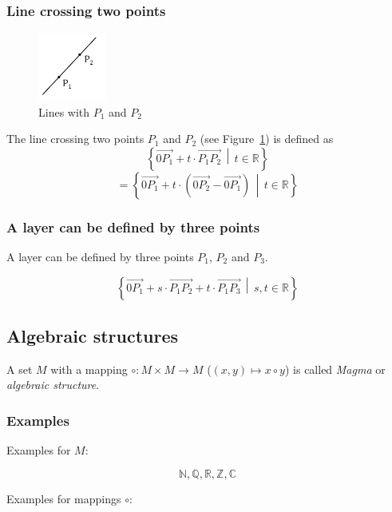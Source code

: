 \documentclass[a4paper,landscape,twocolumn]{article}
\newcommand\setdef[2]{\left\{#1\,\middle|\,#2\right\}}
\begin{document}
\subsubsection{Line crossing two points}
%
\begin{figure}[!h]
  \begin{center}
    \includegraphics[width=0.2\textwidth]{img/line_with_P1_and_P2.pdf}
    \caption{Lines with $P_1$ and $P_2$}
    \label{img:line}
  \end{center}
\end{figure}
%
The line crossing two points $P_1$ and $P_2$ (see Figure~\ref{img:line}) is defined as
\[ \setdef{\overrightarrow{0P_1} + t \cdot \overrightarrow{P_1 P_2}}{t \in \mathbb{R}} \]
\[ = \setdef{\overrightarrow{0P_1} + t \cdot \left(\overrightarrow{0P_2} - \overrightarrow{0P_1}\right)}{t \in \mathbb{R}} \]

\subsubsection{A layer can be defined by three points}

A layer can be defined by three points $P_1$, $P_2$ and $P_3$.

\[ \setdef{\overrightarrow{0P_1} + s \cdot \overrightarrow{P_1 P_2} + t \cdot \overrightarrow{P_1 P_3}}{s, t \in \mathbb{R}} \]

\subsection{Algebraic structures}

A set $M$ with a mapping $\circ: M \times M \rightarrow M$ ($(x, y) \mapsto x \circ y$)
is called \emph{Magma} or \emph{algebraic structure}.

\subsubsection{Examples}

Examples for $M$:

\[ \mathbb{N}, \mathbb{Q}, \mathbb{R}, \mathbb{Z}, \mathbb{C} \]

Examples for mappings $\circ$:
\end{document}

